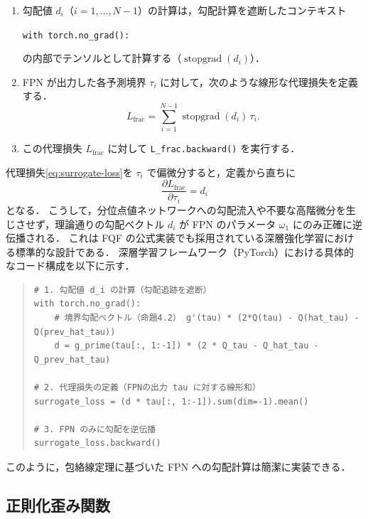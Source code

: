 \documentclass[a4paper,10pt]{jsarticle}
\theoremstyle{definition}
\begin{document}
\begin{enumerate}
  \item 勾配値 $d_i$（$i=1,\dots,N-1$）の計算は，勾配計算を遮断したコンテキスト
  \begin{center}
    \texttt{with torch.no\_grad():}
  \end{center}
  の内部でテンソルとして計算する（$\operatorname{stopgrad}(d_i)$）．
  \item FPN が出力した各予測境界 $\tau_i$ に対して，次のような線形な代理損失を定義する．
  \begin{equation}
    L_{\mathrm{frac}} = \sum_{i=1}^{N-1} \operatorname{stopgrad}(d_i)\,\tau_i.
    \label{eq:surrogate-loss}
  \end{equation}
  \item この代理損失 $L_{\mathrm{frac}}$ に対して \texttt{L\_frac.backward()} を実行する．
\end{enumerate}
代理損失\eqref{eq:surrogate-loss}を $\tau_i$ で偏微分すると，定義から直ちに
\begin{equation}
  \frac{\partial L_{\mathrm{frac}}}{\partial \tau_i} = d_i
\end{equation}
となる．
こうして，分位点値ネットワークへの勾配流入や不要な高階微分を生じさせず，理論通りの勾配ベクトル $d_i$ が FPN のパラメータ $\omega_1$ にのみ正確に逆伝播される．
これは FQF の公式実装でも採用されている深層強化学習における標準的な設計である．
深層学習フレームワーク（PyTorch）における具体的なコード構成を以下に示す．
\begin{quote}
\small
\begin{verbatim}
# 1. 勾配値 d_i の計算（勾配追跡を遮断）
with torch.no_grad():
    # 境界勾配ベクトル（命題4.2） g'(tau) * (2*Q(tau) - Q(hat_tau) - Q(prev_hat_tau))
    d = g_prime(tau[:, 1:-1]) * (2 * Q_tau - Q_hat_tau - Q_prev_hat_tau)

# 2. 代理損失の定義（FPNの出力 tau に対する線形和）
surrogate_loss = (d * tau[:, 1:-1]).sum(dim=-1).mean()

# 3. FPN のみに勾配を逆伝播
surrogate_loss.backward()
\end{verbatim}
\end{quote}
このように，包絡線定理に基づいた FPN への勾配計算は簡潔に実装できる．


\subsection{正則化歪み関数}
\label{subsec:g-reg}
\end{document}
